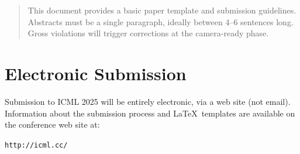 \documentclass{article}
\theoremstyle{plain}
\theoremstyle{definition}
\theoremstyle{remark}
\begin{document}
\printAffiliationsAndNotice{\icmlEqualContribution} %

\begin{abstract}
  This document provides a basic paper template and submission guidelines.
  Abstracts must be a single paragraph, ideally between 4--6 sentences long.
  Gross violations will trigger corrections at the camera-ready phase.
\end{abstract}

\section{Electronic Submission}

Submission to ICML 2025 will be entirely electronic, via a web site
(not email). Information about the submission process and \LaTeX\ templates
are available on the conference web site at:
\begin{center}
  \texttt{http://icml.cc/}
\end{center}
\end{document}
